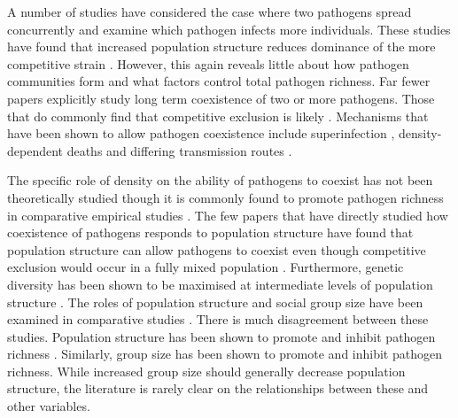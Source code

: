 A number of studies have considered the case where two pathogens spread concurrently and examine which pathogen infects more individuals.
These studies have found that increased population structure reduces dominance of the more competitive strain \cite{van2014domination, poletto2013host, poletto2015characterising}.
However, this again reveals little about how pathogen communities form and what factors control total pathogen richness.
Far fewer papers explicitly study long term coexistence of two or more pathogens.
Those that do commonly find that competitive exclusion is likely \cite{castillo1995dynamics, bremermann1989competitive, martcheva2013competitive, ackleh2003competitive, ackleh2014robust, turner2002impact}.
Mechanisms that have been shown to allow pathogen coexistence include superinfection \cite{may1994superinfection, li2010age}, density-dependent deaths \cite{ackleh2003competitive, kirupaharan2004coexistence} and differing transmission routes \cite{allen2003dynamics}.

The specific role of density on the ability of pathogens to coexist has not been theoretically studied though it is commonly found to promote pathogen richness in comparative empirical studies \cite{kamiya2014determines, nunn2003comparative, arneberg2002host}.
The few papers that have directly studied how coexistence of pathogens responds to population structure have found that population structure can allow pathogens to coexist even though competitive exclusion would occur in a fully mixed population \cite{qiu2013vector, allen2004sis, nunes2006localized}.
Furthermore, genetic diversity has been shown to be maximised at intermediate levels of population structure \cite{campos2006pathogen}.
The roles of population structure and social group size have been examined in comparative studies \cite{maganga2014bat, gay2014parasite, turmelle2009correlates, altizer2003social, bordes2007rodent, ezenwa2006host, rifkin2012animals, vitone2004body}.
There is much disagreement between these studies.
Population structure has been shown to promote \cite{maganga2014bat, turmelle2009correlates} and inhibit pathogen richness \cite{gay2014parasite}.
Similarly, group size has been shown to promote \cite{rifkin2012animals, bordes2007rodent} and inhibit \cite{ezenwa2006host} pathogen richness.
While increased group size should generally decrease population structure, the literature is rarely clear on the relationships between these and other variables.




